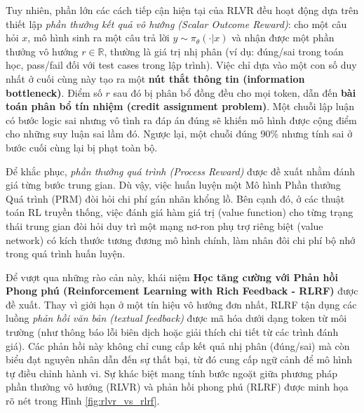 \documentclass[12pt,a4paper]{report}
\begin{document}
Tuy nhiên, phần lớn các cách tiếp cận hiện tại của RLVR đều hoạt động dựa trên thiết lập \textit{phần thưởng kết quả vô hướng (Scalar Outcome Reward)}: cho một câu hỏi $x$, mô hình sinh ra một câu trả lời $y \sim \pi_\theta(\cdot|x)$ và nhận được một phần thưởng vô hướng $r \in \mathbb{R}$, thường là giá trị nhị phân (ví dụ: đúng/sai trong toán học, pass/fail đối với test cases trong lập trình). Việc chỉ dựa vào một con số duy nhất ở cuối cùng này tạo ra một \textbf{nút thắt thông tin (information bottleneck)}. Điểm số $r$ sau đó bị phân bổ đồng đều cho mọi token, dẫn đến \textbf{bài toán phân bổ tín nhiệm (credit assignment problem)}. Một chuỗi lập luận có bước logic sai nhưng vô tình ra đáp án đúng sẽ khiến mô hình được cộng điểm cho những suy luận sai lầm đó. Ngược lại, một chuỗi đúng 90\% nhưng tính sai ở bước cuối cùng lại bị phạt toàn bộ.

Để khắc phục, \textit{phần thưởng quá trình (Process Reward)} được đề xuất nhằm đánh giá từng bước trung gian. Dù vậy, việc huấn luyện một Mô hình Phần thưởng Quá trình (PRM) đòi hỏi chi phí gán nhãn khổng lồ. Bên cạnh đó, ở các thuật toán RL truyền thống, việc đánh giá hàm giá trị (value function) cho từng trạng thái trung gian đòi hỏi duy trì một mạng nơ-ron phụ trợ riêng biệt (value network) có kích thước tương đương mô hình chính, làm nhân đôi chi phí bộ nhớ trong quá trình huấn luyện.

Để vượt qua những rào cản này, khái niệm \textbf{Học tăng cường với Phản hồi Phong phú (Reinforcement Learning with Rich Feedback - RLRF)} được đề xuất. Thay vì giới hạn ở một tín hiệu vô hướng đơn nhất, RLRF tận dụng các luồng \textit{phản hồi văn bản (textual feedback)} được mã hóa dưới dạng token từ môi trường (như thông báo lỗi biên dịch hoặc giải thích chi tiết từ các trình đánh giá). Các phản hồi này không chỉ cung cấp kết quả nhị phân (đúng/sai) mà còn biểu đạt nguyên nhân dẫn đến sự thất bại, từ đó cung cấp ngữ cảnh để mô hình tự điều chỉnh hành vi. Sự khác biệt mang tính bước ngoặt giữa phương pháp phần thưởng vô hướng (RLVR) và phản hồi phong phú (RLRF) được minh họa rõ nét trong Hình \ref{fig:rlvr_vs_rlrf}.
\end{document}
